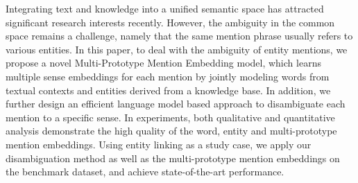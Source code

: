 Integrating text and knowledge into a unified semantic space has attracted significant research interests recently. However, the ambiguity in the common space remains a challenge, namely that the same mention phrase usually refers to various entities. In this paper, to deal with the ambiguity of entity mentions, we propose a novel Multi-Prototype Mention Embedding model, which learns multiple sense embeddings for each mention by jointly modeling words from textual contexts and entities derived from a knowledge base. In addition, we further design an efficient language model based approach to disambiguate each mention to a specific sense. In experiments, both qualitative and quantitative analysis demonstrate the high quality of the word, entity and multi-prototype mention embeddings. Using entity linking as a study case, we apply our disambiguation method as well as the multi-prototype mention embeddings on the benchmark dataset, and achieve state-of-the-art performance.
